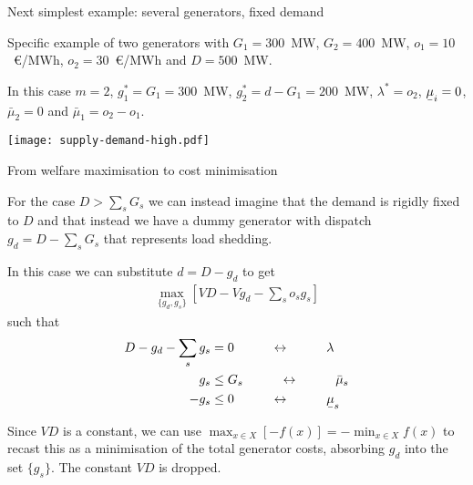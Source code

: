\documentclass[10pt,aspectratio=169,dvipsnames]{beamer}
\def\l{\lambda}
\def\m{\mu}
\newcommand{\ubar}[1]{\text{\b{$#1$}}}
\begin{document}
\begin{frame}{Next simplest example: several generators, fixed demand}

  Specific example of two generators with $G_1 = 300$~MW, $G_2 =
  400$~MW, $o_1 = 10$~\euro/MWh, $o_2 = 30$~\euro/MWh and $D = 500$~MW.

  In this case $m=2$, $g_1^* = G_1 = 300$~MW, $g_2^* = d - G_1 = 200$~MW,
  $\l^* = o_2$, $\ubar{\m}_i = 0$, $\bar{\m}_2 = 0$ and $\bar{\m}_1 =
  o_2 - o_1$.

  \centering
  \texttt{[image: supply-demand-high.pdf]}




\end{frame}





\begin{frame}{From welfare maximisation to cost minimisation}

  For the case $D > \sum_s G_s$ we can instead imagine that the demand
  is rigidly fixed to $D$ and that instead we have a dummy generator
  with dispatch $g_d = D-\sum_s G_s$ that represents \alert{load shedding}.

  In this case we can substitute $d = D - g_d$ to get
  \begin{align*}
    \max_{\{g_d, g_s\}}  \left[ VD - Vg_d  -  \sum_s o_s g_s \right]
  \end{align*}
  such that
  \begin{align*}
    D - g_d -  \sum_s g_s  & = 0 \hspace{1cm} \leftrightarrow \hspace{1cm} \l \\
        g_s  & \leq  G_s  \hspace{1cm}\leftrightarrow\hspace{1cm} \bar{\m}_s \\
    - g_s  & \leq  0  \hspace{1cm}\leftrightarrow\hspace{1cm} \ubar{\m}_s
  \end{align*}

  Since $VD$ is a constant, we can use
      $\max_{x\in X} \left[ -f(x)\right] = - \min_{x\in X} f(x)$
  to recast this as a minimisation of the total generator costs,
  absorbing $g_d$ into the set $\{g_s\}$. The constant $VD$ is dropped.

\end{frame}
\end{document}
